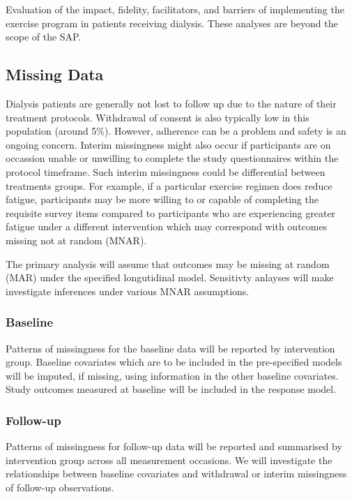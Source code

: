 \documentclass[
]{article}
\begin{document}
Evaluation of the impact, fidelity, facilitators, and barriers of implementing the exercise program in patients receiving dialysis.
These analyses are beyond the scope of the SAP.


\hypertarget{missing-data}{%
\subsection{Missing Data}\label{missing-data}}

Dialysis patients are generally not lost to follow up due to the nature of their treatment protocols.
Withdrawal of consent is also typically low in this population (around 5\%).
However, adherence can be a problem and safety is an ongoing concern.
Interim missingness might also occur if participants are on occassion unable or unwilling to complete the study questionnaires within the protocol timeframe.
Such interim missingness could be differential between treatments groups.
For example, if a particular exercise regimen does reduce fatigue, participants may be more willing to or capable of completing the requisite survey items compared 
to participants who are experiencing greater fatigue under a different intervention which may correspond with outcomes missing not at random (MNAR).

The primary analysis will assume that outcomes may be missing at random (MAR) under the specified longutidinal model.
Sensitivty anlayses will make investigate inferences under various MNAR assumptions. 

\subsubsection{Baseline}

Patterns of missingness for the baseline data will be reported by intervention group.
Baseline covariates which are to be included in the pre-specified models will be imputed, if missing, using information in the other baseline covariates.
Study outcomes measured at baseline will be included in the response model.


\subsubsection{Follow-up}

Patterns of missingness for follow-up data will be reported and summarised by intervention group across all measurement occasions.
We will investigate the relationships between baseline covariates and withdrawal or interim missingness of follow-up observations.
\end{document}
